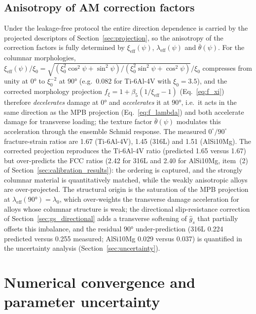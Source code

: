 \documentclass[twocolumn]{sagej}
\begin{document}
\subsection{Anisotropy of AM correction factors}
\label{sec:aniso_factors}

Under the leakage-free protocol the entire direction dependence is carried by the projected descriptors of Section~\ref{sec:projection}, so the anisotropy of the correction factors is fully determined by $\xi_{\mathrm{eff}}(\psi)$, $\lambda_{\mathrm{eff}}(\psi)$ and $\bar\theta(\psi)$. For the columnar morphologies, $\xi_{\mathrm{eff}}(\psi)/\xi_0 = \sqrt{(\xi_0^2\cos^2\psi + \sin^2\psi)/(\xi_0^2\sin^2\psi + \cos^2\psi)}/\xi_0$ compresses from unity at $\ang{0}$ to $\xi_0^{-2}$ at $\ang{90}$ (e.g.\ $0.082$ for Ti-6Al-4V with $\xi_0 = 3.5$), and the corrected morphology projection $f_\xi = 1 + \beta_5(1/\xi_{\mathrm{eff}} - 1)$ (Eq.~\eqref{eq:f_xi}) therefore \emph{decelerates} damage at $\ang{0}$ and \emph{accelerates} it at $\ang{90}$, i.e.\ it acts in the same direction as the MPB projection (Eq.~\eqref{eq:f_lambda}) and both accelerate damage for transverse loading; the texture factor $\bar\theta(\psi)$ modulates this acceleration through the ensemble Schmid response. The measured $0^\circ/90^\circ$ fracture-strain ratios are 1.67 (Ti-6Al-4V), 1.45 (316L) and 1.51 (AlSi10Mg). The corrected projection reproduces the Ti-6Al-4V ratio (predicted 1.65 versus 1.67) but over-predicts the FCC ratios (2.42 for 316L and 2.40 for AlSi10Mg, item~(2) of Section~\ref{sec:calibration_results}): the ordering is captured, and the strongly columnar material is quantitatively matched, while the weakly anisotropic alloys are over-projected. The structural origin is the saturation of the MPB projection at $\lambda_{\mathrm{eff}}(\ang{90}) = \lambda_0$, which over-weights the transverse damage acceleration for alloys whose columnar structure is weak; the directional slip-resistance correction of Section~\ref{sec:gs_directional} adds a transverse softening of $\hat{g}_s$ that partially offsets this imbalance, and the residual $\ang{90}$ under-prediction (316L 0.224 predicted versus 0.255 measured; AlSi10Mg 0.029 versus 0.037) is quantified in the uncertainty analysis (Section~\ref{sec:uncertainty}).

\section{Numerical convergence and parameter uncertainty}
\label{sec:convergence}
\end{document}
